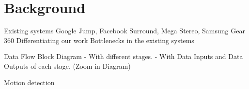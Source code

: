 \chapter{Background}
Existing systems \newline
Google Jump, Facebook Surround, Mega Stereo, Samsung Gear 360 \newline
Differentiating our work \newline
Bottlenecks in the existing systems \newline

Data Flow \newline
Block Diagram
- With different stages.
- With Data Inputs and Data Outputs of each stage. (Zoom in Diagram)



Motion detection 
